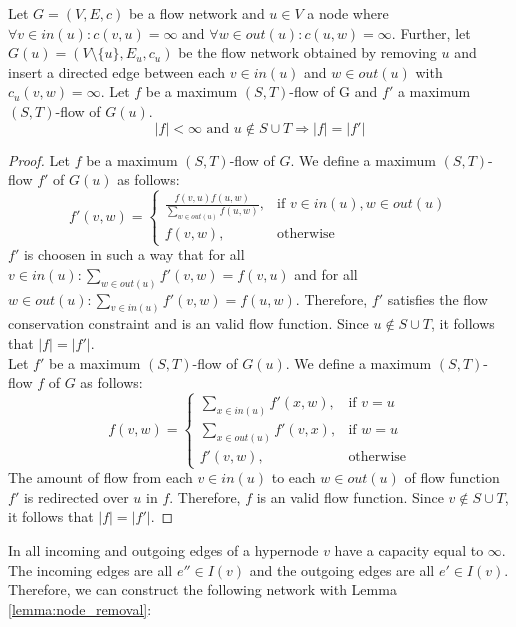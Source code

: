 \begin{lemma}
\label{lemma:node_removal}
Let $G = (V,E,c)$ be a flow network and $u \in V$ a node where
$\forall v \in in(u): c(v,u) = \infty$ and $\forall w \in out(u): c(u,w) = \infty$.
Further, let $G(u) = (V\setminus\{u\}, E_u, c_u)$ be the flow network obtained by removing
$u$ and insert a directed edge between each $v \in in(u)$ and $w \in out(u)$ with $c_u(v,w) = \infty$.
Let $f$ be a maximum $(S,T)$-flow of G and $f'$ a maximum $(S,T)$-flow of
$G(u)$.
\[|f| < \infty \text{ and } u \notin S\cup T \Rightarrow |f| = |f'|\]
\end{lemma}

\begin{proof}
Let $f$ be a maximum $(S,T)$-flow of $G$. We define a maximum $(S,T)$-flow $f'$ 
of $G(u)$ as follows:
\[ 
f'(v,w) =  
  \begin{cases}
      \frac{f(v,u)f(u,w)}{\sum_{w \in out(u)} f(u,w)}, & \text{if } v \in in(u), w \in out(u) \\
      f(v,w), & \text{otherwise}
   \end{cases} 
\]
$f'$ is choosen in such a way that for all $v \in in(u): \sum_{w \in out(u)} f'(v,w) = f(v,u)$
and for all $w \in out(u): \sum_{v \in in(u)} f'(v,w) = f(u,w)$. Therefore, $f'$
satisfies the flow conservation constraint and is an valid flow function. Since
$u \notin S\cup T$, it follows that $|f| = |f'|$. \\
Let $f'$ be a maximum $(S,T)$-flow of $G(u)$. We define a maximum $(S,T)$-flow $f$
of $G$ as follows:
\[
f(v,w) =  
  \begin{cases}
      \sum_{x \in in(u)} f'(x,w), & \text{if } v = u \\
      \sum_{x \in out(u)} f'(v,x), & \text{if } w = u \\
      f'(v,w), & \text{otherwise}
   \end{cases} 
\]
The amount of flow from each $v \in in(u)$ to each $w \in out(u)$ of flow function
$f'$ is redirected over $u$ in $f$. Therefore, $f$ is an valid flow function.
Since $v \notin S\cup T$, it follows that $|f| = |f'|$.
\end{proof}

In  all incoming and outgoing edges of a hypernode $v$ have a
capacity equal to $\infty$. The incoming edges are all $e'' \in I(v)$ and
the outgoing edges are all $e' \in I(v)$. Therefore, we can construct the
following network with Lemma \ref{lemma:node_removal}:

